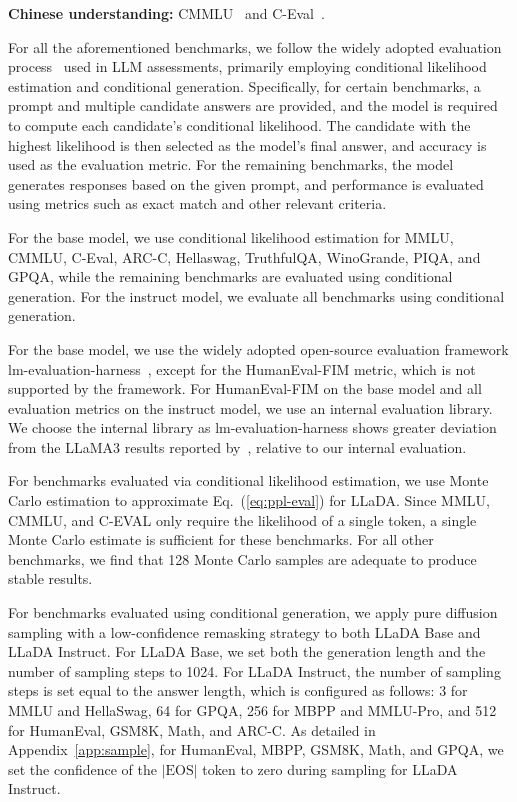 \documentclass{article}
\begin{document}
\textbf{Chinese understanding:} CMMLU~\cite{li2023cmmlu} and C-Eval~\cite{huang2024c}.


For all the aforementioned benchmarks, we follow the widely adopted evaluation process~\cite{eval-harness} used in LLM assessments, primarily employing conditional likelihood estimation and conditional generation. Specifically, for certain benchmarks, a prompt and multiple candidate answers are provided, and the model is required to compute each candidate's conditional likelihood. The candidate with the highest likelihood is then selected as the model’s final answer, and accuracy is used as the evaluation metric. For the remaining benchmarks, the model generates responses based on the given prompt, and performance is evaluated using metrics such as exact match and other relevant criteria.

For the base model, we use conditional likelihood estimation for MMLU, CMMLU, C-Eval, ARC-C, Hellaswag, TruthfulQA, WinoGrande, PIQA, and GPQA, while the remaining benchmarks are evaluated using conditional generation. For the instruct model, we evaluate all benchmarks using conditional generation.


For the base model, we use the widely adopted open-source evaluation framework lm-evaluation-harness~\cite{eval-harness}, except for the HumanEval-FIM metric, which is not supported by the framework. For HumanEval-FIM on the base model and all evaluation metrics on the instruct model, we use an internal evaluation library. We choose the internal library as lm-evaluation-harness shows greater deviation from the LLaMA3 results reported by~\citet{qwen2}, relative to our internal evaluation.



For benchmarks evaluated via conditional likelihood estimation, we use Monte Carlo estimation to approximate Eq.~(\ref{eq:ppl-eval}) for LLaDA. Since MMLU, CMMLU, and C-EVAL only require the likelihood of a single token, a single Monte Carlo estimate is sufficient for these benchmarks. For all other benchmarks, we find that 128 Monte Carlo samples are adequate to produce stable results. 


For benchmarks evaluated using conditional generation, we apply pure diffusion sampling with a low-confidence remasking strategy to both LLaDA Base and LLaDA Instruct. For LLaDA Base, we set both the generation length and the number of sampling steps to 1024. For LLaDA Instruct, the number of sampling steps is set equal to the answer length, which is configured as follows: 3 for MMLU and HellaSwag, 64 for GPQA, 256 for MBPP and MMLU-Pro, and 512 for HumanEval, GSM8K, Math, and ARC-C. As detailed in Appendix~\ref{app:sample}, for HumanEval, MBPP, GSM8K, Math, and GPQA, we set the confidence of the $|\text{EOS}|$ token to zero during sampling for LLaDA Instruct.
\end{document}
